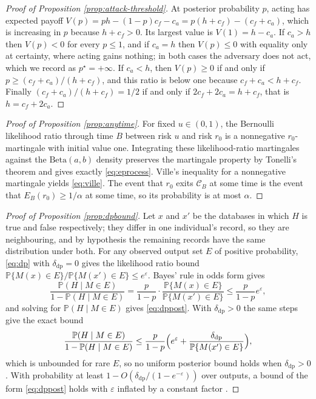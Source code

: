 \documentclass[11pt,a4paper]{article}
\theoremstyle{plain}
\theoremstyle{definition}
\theoremstyle{definition}
\theoremstyle{plain}
\newcommand{\Prob}{\mathbb{P}}
\begin{document}
\begin{proof}[Proof of Proposition \ref{prop:attack-threshold}]
At posterior probability $p$, acting has expected payoff
$V(p)=ph-(1-p)c_f-c_a=p(h+c_f)-(c_f+c_a)$, which is increasing in $p$
because $h+c_f>0$. Its largest value is $V(1)=h-c_a$. If $c_a>h$ then
$V(p)<0$ for every $p\le1$, and if $c_a=h$ then $V(p)\le0$ with equality only at
certainty, where acting gains nothing; in both cases the adversary does not act,
which we record as $p^\star=+\infty$. If $c_a<h$, then $V(p)\ge0$ if and only if
$p\ge(c_f+c_a)/(h+c_f)$, and this ratio is below one because $c_f+c_a<h+c_f$.
Finally $(c_f+c_a)/(h+c_f)=1/2$ if and only if $2c_f+2c_a=h+c_f$, that is
$h=c_f+2c_a$.
\end{proof}

\begin{proof}[Proof of Proposition \ref{prop:anytime}]
For fixed $u\in(0,1)$, the Bernoulli likelihood ratio through time $B$ between
risk $u$ and risk $r_0$ is a nonnegative $r_0$-martingale with initial value
one. Integrating these likelihood-ratio martingales against the
$\mathrm{Beta}(a,b)$ density preserves the martingale property by Tonelli's
theorem and gives exactly \eqref{eq:eprocess}. Ville's inequality for a
nonnegative martingale yields \eqref{eq:ville}. The event that $r_0$ exits
$\mathcal C_B$ at some time is the event that $E_B(r_0)\ge1/\alpha$ at some
time, so its probability is at most $\alpha$.
\end{proof}

\begin{proof}[Proof of Proposition \ref{prop:dpbound}]
Let $x$ and $x'$ be the databases in which $H$ is true and false respectively;
they differ in one individual's record, so they are neighbouring, and by
hypothesis the remaining records have the same distribution under both. For any
observed output set $E$ of positive probability, \eqref{eq:dp} with
$\delta_{\mathrm{dp}} = 0$ gives the likelihood ratio bound
$\Prob\{M(x) \in E\} / \Prob\{M(x') \in E\} \leq e^\varepsilon$. Bayes' rule in odds form gives
\[
\frac{\Prob(H \mid M \in E)}{1 - \Prob(H \mid M \in E)}
= \frac{p}{1-p}\cdot\frac{\Prob\{M(x) \in E\}}{\Prob\{M(x') \in E\}}
\leq \frac{p}{1-p}e^{\varepsilon} ,
\]
and solving for $\Prob(H \mid M \in E)$ gives \eqref{eq:dppost}. With
$\delta_{\mathrm{dp}} > 0$ the same steps give the exact bound
\[
\frac{\Prob(H \mid M \in E)}{1 - \Prob(H \mid M \in E)}
\leq \frac{p}{1-p}\Bigl(e^{\varepsilon}
+ \frac{\delta_{\mathrm{dp}}}{\Prob\{M(x') \in E\}}\Bigr) ,
\]
which is unbounded for rare $E$, so no uniform posterior bound holds when
$\delta_{\mathrm{dp}} > 0$. With probability at least
$1 - O(\delta_{\mathrm{dp}}/(1-e^{-\varepsilon}))$ over outputs, a bound of the
form \eqref{eq:dppost} holds with $\varepsilon$ inflated by a constant factor
\citep{kasiviswanathan2014}.
\end{proof}
\end{document}
